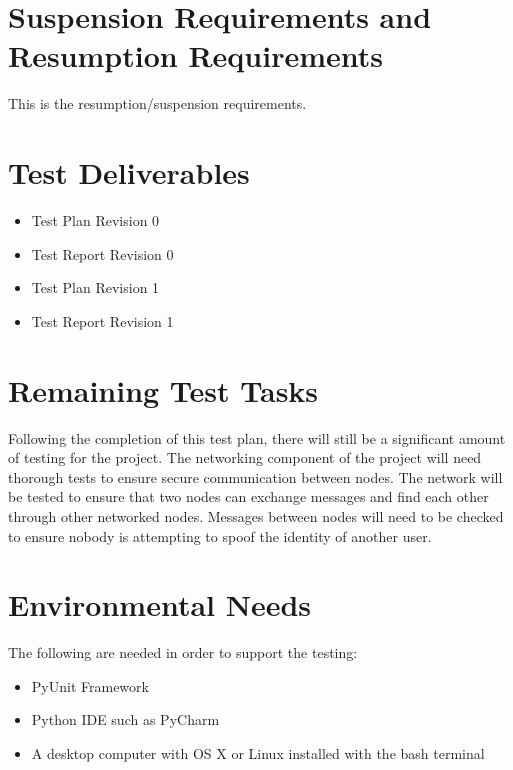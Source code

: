\documentclass{article}
\begin{document}
\section*{Suspension Requirements and Resumption Requirements}
This is the resumption/suspension requirements.

\section*{Test Deliverables}
\begin{itemize}
 \item
Test Plan Revision 0
 \item
Test Report Revision 0
 \item
Test Plan Revision 1
 \item
Test Report Revision 1
\end{itemize}

\section*{Remaining Test Tasks}
Following the completion of this test plan, there will still be a significant amount of testing for the project. The networking component of the project will need thorough tests to ensure secure communication between nodes. The network will be tested to ensure that two nodes can exchange messages and find each other through other networked nodes. Messages between nodes will need to be checked to ensure nobody is attempting to spoof the identity of another user. 

\section*{Environmental Needs}
The following are needed in order to support the testing:
\newline
\begin{itemize}
 \item
PyUnit Framework
 \item
Python IDE such as PyCharm
 \item
A desktop computer with OS X or Linux installed with the bash terminal
\end{itemize}

\end{document}
